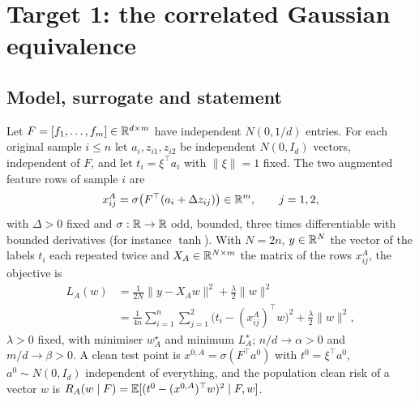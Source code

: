 \section{Target 1: the correlated Gaussian equivalence}\label{sec:proofT1}

\subsection{Model, surrogate and statement}

Let $F=[f_1,\dots,f_m]\in\mathbb{R}^{d\times m}$ have independent $N(0,1/d)$ entries. For each original sample
$i\le n$ let $a_i,z_{i1},z_{i2}$ be independent $N(0,I_d)$ vectors, independent of $F$, and let
$t_i=\xi^\top a_i$ with $\|\xi\|=1$ fixed. The two augmented feature rows of sample $i$ are
\[
x^A_{ij}=\sigma\big(F^\top(a_i+\Delta z_{ij})\big)\in\mathbb{R}^m,\qquad j=1,2,
\]
with $\Delta>0$ fixed and $\sigma:\mathbb{R}\to\mathbb{R}$ odd, bounded, three times differentiable with bounded
derivatives (for instance $\tanh$). With $N=2n$, $y\in\mathbb{R}^N$ the vector of the labels $t_i$ each repeated
twice and $X_A\in\mathbb{R}^{N\times m}$ the matrix of the rows $x^A_{ij}$, the objective is
\begin{equation}
\begin{aligned}
L_A(w)&=\frac1{2N}\|y-X_Aw\|^2+\frac\lambda2\|w\|^2\\
&=\frac1{4n}\sum_{i=1}^n\sum_{j=1}^2\big(t_i-(x^A_{ij})^\top w\big)^2+\frac\lambda2\|w\|^2 ,
\end{aligned}
\label{eq:objective}
\end{equation}
$\lambda>0$ fixed, with minimiser $w_A^\star$ and minimum $L_A^\star$; $n/d\to\alpha>0$ and $m/d\to\beta>0$.
A clean test point is $x^{0,A}=\sigma(F^\top a^0)$ with $t^0=\xi^\top a^0$, $a^0\sim N(0,I_d)$ independent of
everything, and the population clean risk of a vector $w$ is
$R_A(w\mid F)=\mathbb{E}[(t^0-(x^{0,A})^\top w)^2\mid F,w]$.


